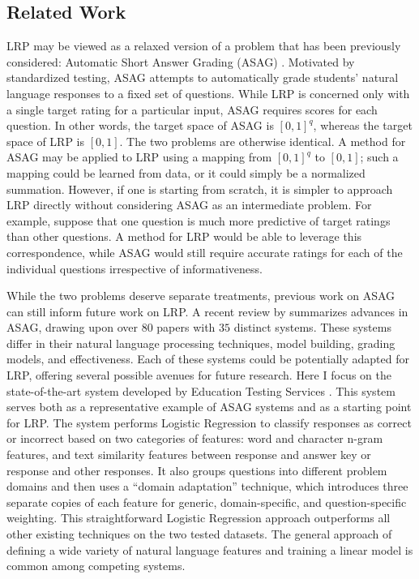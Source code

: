 \subsection{Related Work}
LRP may be viewed as a relaxed version of a problem that has been previously considered: Automatic Short Answer Grading (ASAG)  \citep{burrows2015eras, pulman2005automatic, sukkarieh2009c, ziai2012short}. Motivated by standardized testing, ASAG attempts to automatically grade students' natural language responses to a fixed set of questions. While LRP is concerned only with a single target rating for a particular input, ASAG requires scores for each question. In other words, the target space of ASAG is $[0, 1]^q$, whereas the target space of LRP is $[0, 1]$. The two problems are otherwise identical. A method for ASAG may be applied to LRP using a mapping from $[0, 1]^q$ to $[0, 1]$; such a mapping could be learned from data, or it could simply be a normalized summation. However, if one is starting from scratch, it is simpler to approach LRP directly without considering ASAG as an intermediate problem. For example, suppose that one question is much more predictive of target ratings than other questions. A method for LRP would be able to leverage this correspondence, while ASAG would still require accurate ratings for each of the individual questions irrespective of informativeness.

While the two problems deserve separate treatments, previous work on ASAG can still inform future work on LRP. A recent review by \citet{burrows2015eras} summarizes advances in ASAG, drawing upon over $80$ papers with $35$ distinct systems. These systems differ in their natural language processing techniques, model building, grading models, and effectiveness. Each of these systems could be potentially adapted for LRP, offering several possible avenues for future research. Here I focus on the state-of-the-art system developed by Education Testing Services \citep{heilman2013ets}. This system serves both as a representative example of ASAG systems and as a starting point for LRP. The system performs Logistic Regression to classify responses as correct or incorrect based on two categories of features: word and character n-gram features, and text similarity features between response and answer key or response and other responses. It also groups questions into different problem domains and then uses a ``domain adaptation'' technique, which introduces three separate copies of each feature for generic, domain-specific, and question-specific weighting. This straightforward Logistic Regression approach outperforms all other existing techniques on the two tested datasets. The general approach of defining a wide variety of natural language features and training a linear model is common among competing systems.

